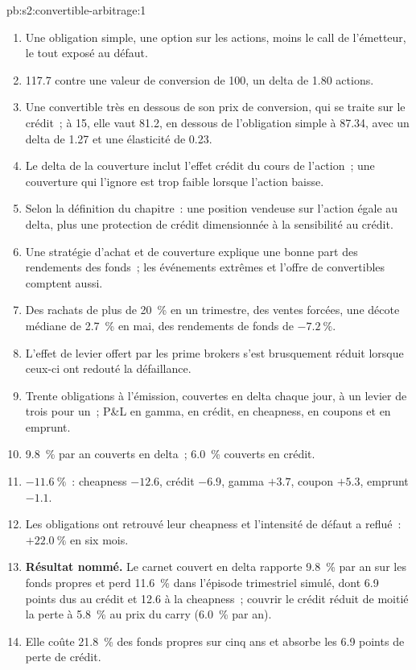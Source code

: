 \begin{solution}{pb:s2:convertible-arbitrage:1}
\begin{enumerate}
\item Une obligation simple, une option sur les actions, moins le call de l'émetteur, le tout exposé au défaut.
\item 117.7 contre une valeur de conversion de 100, un delta de 1.80 actions.
\item Une convertible très en dessous de son prix de conversion, qui se traite sur le crédit~; à 15, elle vaut 81.2, en dessous de l'obligation simple à 87.34, avec un delta de 1.27
et une élasticité de 0.23.
\item Le delta de la couverture inclut l'effet crédit du cours de l'action~; une couverture qui l'ignore est trop faible lorsque l'action baisse.
\item Selon la définition du chapitre~: une position vendeuse sur l'action égale au delta, plus une protection de crédit dimensionnée à la sensibilité au crédit.
\item Une stratégie d'achat et de couverture explique une bonne part des rendements des fonds~; les événements extrêmes et l'offre de convertibles comptent aussi.
\item Des rachats de plus de 20~\% en un trimestre, des ventes forcées, une décote médiane de 2.7~\% en mai, des rendements de fonds de $-7.2~\%$.
\item L'effet de levier offert par les prime brokers s'est brusquement réduit lorsque ceux-ci ont redouté la défaillance.
\item Trente obligations à l'émission, couvertes en delta chaque jour, à un levier de trois pour un~; P\&L en gamma, en crédit, en cheapness, en coupons et en emprunt.
\item 9.8~\% par an couverts en delta~; 6.0~\% couverts en crédit.
\item $-11.6~\%$~: cheapness $-12.6$, crédit $-6.9$, gamma $+3.7$, coupon $+5.3$, emprunt $-1.1$.
\item Les obligations ont retrouvé leur cheapness et l'intensité de défaut a reflué~: $+22.0~\%$ en six mois.
\item \textbf{Résultat nommé.} Le carnet couvert en delta rapporte 9.8~\% par an sur les fonds propres et perd 11.6~\% dans l'épisode trimestriel simulé, dont 6.9 points dus au
crédit et 12.6 à la cheapness~; couvrir le crédit réduit de moitié la perte à 5.8~\% au prix du carry (6.0~\% par an).
\item Elle coûte 21.8~\% des fonds propres sur cinq ans et absorbe les 6.9 points de perte de crédit.

\end{enumerate}
\end{solution}
